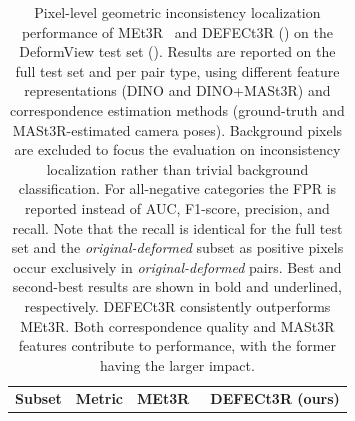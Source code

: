\begin{table}[tb]
    \centering


    \newcommand{\best}[1]{\textbf{#1}}
    \newcommand{\seco}[1]{\underline{#1}}
    \newcommand{\othe}[1]{#1}


    \caption{
        Pixel-level geometric inconsistency localization performance of MEt3R~\cite{MEt3R} and DEFECt3R () on the DeformView test set ().
        Results are reported on the full test set and per pair type, using different feature representations (DINO and DINO+MASt3R) and correspondence estimation methods (ground-truth and MASt3R-estimated camera poses).
        Background pixels are excluded to focus the evaluation on inconsistency localization rather than trivial background classification.
        For all-negative categories the FPR is reported instead of AUC, F1-score, precision, and recall.
        Note that the recall is identical for the full test set and the \textit{original-deformed} subset as positive pixels occur exclusively in \textit{original-deformed} pairs.
        Best and second-best results are shown in bold and underlined, respectively.
        DEFECt3R consistently outperforms MEt3R. Both correspondence quality and MASt3R features contribute to performance, with the former having the larger impact.
    }
    \label{table:evaluation-pixel-level-fused}
    

    \begin{tabular}{l l c c c c c}
        \toprule
    
        \textbf{Subset}
        & \textbf{Metric}    
        & \multicolumn{2}{c}{\textbf{MEt3R}~\cite{MEt3R}}
        & \multicolumn{3}{c}{\textbf{DEFECt3R (ours)}} \\


\end{tabular}
\end{table}

